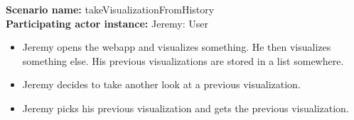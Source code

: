 \documentclass[parskip=full,11pt]{scrartcl}
\begin{document}
\textbf{Scenario name:} takeVisualizationFromHistory\\
\textbf{Participating actor instance:} Jeremy: User
\begin{itemize}
	\item Jeremy opens the webapp and visualizes something. He then visualizes something else. His previous visualizations are stored in a list somewhere.
	\item Jeremy decides to take another look at a previous visualization.
	\item Jeremy picks his previous visualization and gets the previous visualization.
\end{itemize}


\appendix


\printnoidxglossaries
\end{document}
